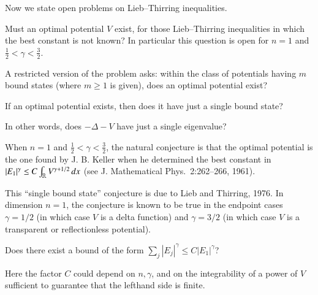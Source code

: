 \documentclass[12pt,letterpaper, reqno]{aimpl}
\begin{document}
\vspace{6pt}
Now we state open problems on Lieb--Thirring
inequalities.



\begin{prob}[2.1]
 Must an optimal potential $V$ exist, for
those Lieb--Thirring inequalities in which the best constant is not
known? In particular this question is open for $n=1$ and
$\frac{1}{2} < \gamma < \frac{3}{2}$.
\end{prob}

\begin{prob}[2.13]
A restricted version of the problem asks: within the class of
potentials having $m$ bound states (where $m \geq 1$ is given), does
an optimal potential exist?
\end{prob}




\begin{problemblock}


\begin{problem}[2.16]
 If an optimal potential
exists, then does it have just a single bound state?
\end{problem}

In other
words, does $-\Delta - V$ have just a single eigenvalue?


\begin{remark}
When $n=1$
and $\frac{1}{2} < \gamma < \frac{3}{2}$, the natural conjecture is
that the optimal potential is the one found by J. B. Keller when he
determined the best constant in $|E_1|^\gamma \leq C \int_\mathbb R
V^{\gamma + 1/2} \, dx$ (see J. Mathematical Phys.\ 2:262--266,
1961).
\end{remark}

\begin{remark}
This ``single bound state'' conjecture is due to Lieb and Thirring,
1976. In dimension $n=1$, the conjecture is known to be true in the
endpoint cases $\gamma=1/2$ (in which case $V$ is a delta function)
and $\gamma=3/2$ (in which case $V$ is a transparent or
reflectionless potential).
\end{remark}

\end{problemblock}

\begin{problemblock}

\begin{problem}[2.2]
  Does there exist a bound of the
form $\sum_j |E_j|^\gamma \leq C |E_1|^\gamma$? 
\end{problem}

 Here the factor $C$
could depend on $n,\gamma$, and on the integrability of a power of
$V$ sufficient to guarantee that the lefthand side is finite.

\end{problemblock}
\end{document}
